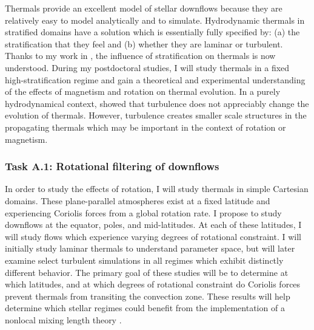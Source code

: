 \documentclass[aasms,11pt]{article}
\begin{document}
Thermals provide an excellent model of stellar downflows because they are relatively easy to model analytically and to simulate.
Hydrodynamic thermals in stratified domains have a solution which is essentially fully specified by: (a) the stratification that they feel and (b) whether they are laminar or turbulent.
Thanks to my work in \citet{andersLB2019}, the influence of stratification on thermals is now understood.
During my postdoctoral studies, I will study thermals in a fixed high-stratification regime and gain a theoretical and experimental understanding of the effects of magnetism and rotation on thermal evolution.
In a purely hydrodynamical context, \citet{lecoanet&jeevanjee2019} showed that turbulence does not appreciably change the evolution of thermals.
However, turbulence creates smaller scale structures in the propagating thermals which may be important in the context of rotation or magnetism.

\subsubsection{Task A.1: Rotational filtering of downflows}
\label{sct:taskA1}
In order to study the effects of rotation, I will study thermals in simple Cartesian domains.
These plane-parallel atmospheres exist at a fixed latitude and experiencing Coriolis forces from a global rotation rate.
I propose to study downflows at the equator, poles, and mid-latitudes.
At each of these latitudes, I will study flows which experience varying degrees of rotational constraint.
I will initially study laminar thermals to understand parameter space, but will later examine select turbulent simulations in all regimes which exhibit distinctly different behavior.
The primary goal of these studies will be to determine at which latitudes, and at which degrees of rotational constraint do Coriolis forces prevent thermals from transiting the convection zone.
These results will help determine which stellar regimes could benefit from the implementation of a nonlocal mixing length theory \citep[as in][]{brandenburg2016}.
\end{document}
